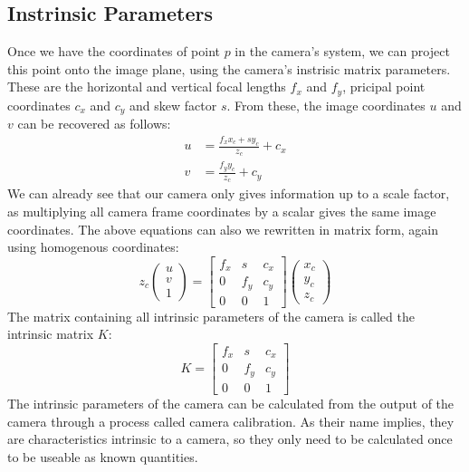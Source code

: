 \subsection{Instrinsic Parameters}
Once we have the coordinates of point $p$ in the camera's system, we can project this point onto the image plane, using the camera's instrisic matrix parameters. These are the horizontal and vertical focal lengths $f_x$ and $f_y$, pricipal point coordinates $c_x$ and $c_y$ and skew factor $s$. From these, the image coordinates $u$ and $v$ can be recovered as follows:
\begin{align}
  u &= \frac{f_xx_c + sy_c}{z_c} + c_x\\
  v &= \frac{f_yy_c}{z_c} + c_y
\end{align}
We can already see that our camera only gives information up to a scale factor, as multiplying all camera frame coordinates by a scalar gives the same image coordinates. The above equations can also we rewritten in matrix form, again using homogenous coordinates:
\begin{equation}
  z_c \begin{pmatrix} u\\v\\1 \end{pmatrix} =
  \begin{bmatrix}
  f_x & s   & c_x \\
  0   & f_y & c_y \\
  0   & 0   & 1
  \end{bmatrix} \begin{pmatrix} x_c\\y_c\\z_c \end{pmatrix}
\end{equation}
The matrix containing all intrinsic parameters of the camera is called the intrinsic matrix $K$:
\begin{equation}
  K = \begin{bmatrix}
  f_x & s   & c_x \\
  0   & f_y & c_y \\
  0   & 0   & 1
\end{bmatrix}
\end{equation}
The intrinsic parameters of the camera can be calculated from the output of the camera through a process called camera calibration. As their name implies, they are characteristics intrinsic to a camera, so they only need to be calculated once to be useable as known quantities.\\
